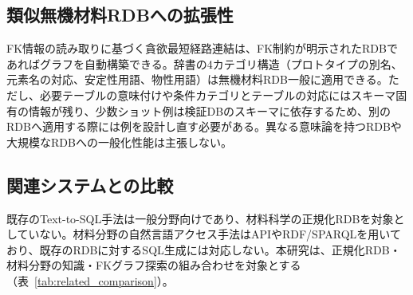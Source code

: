 \documentclass[twocolumn]{interact}
\begin{document}
\subsection{類似無機材料RDBへの拡張性}
\label{sec:extensibility}

FK情報の読み取りに基づく貪欲最短経路連結は、FK制約が明示されたRDBであればグラフを自動構築できる。辞書の4カテゴリ構造（プロトタイプの別名、元素名の対応、安定性用語、物性用語）は無機材料RDB一般に適用できる。ただし、必要テーブルの意味付けや条件カテゴリとテーブルの対応にはスキーマ固有の情報が残り、少数ショット例は検証DBのスキーマに依存するため、別のRDBへ適用する際には例を設計し直す必要がある。異なる意味論を持つRDBや大規模なRDBへの一般化性能は主張しない。

\subsection{関連システムとの比較}

既存のText-to-SQL手法は一般分野向けであり、材料科学の正規化RDBを対象としていない。材料分野の自然言語アクセス手法はAPIやRDF/SPARQLを用いており、既存のRDBに対するSQL生成には対応しない。本研究は、正規化RDB・材料分野の知識・FKグラフ探索の組み合わせを対象とする（表~\ref{tab:related_comparison}）。
\end{document}

